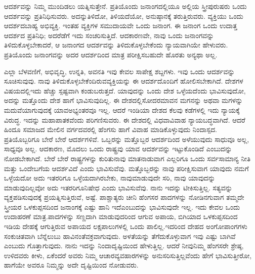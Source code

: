 ಆದರ್ಶವನ್ನು ನಿಮ್ಮ ಮುಂದಿಡಲು ಯತ್ನಿಸುತ್ತೇನೆ. ಪ್ರತಿಯೊಂದು ಜನಾಂಗ\break ದಲ್ಲಿಯೂ ಅಲ್ಲಿಯ ಸ್ತ್ರೀಪುರುಷರು ಒಂದು ಆದರ್ಶವನ್ನು ಪ್ರತಿನಿಧಿಸುವರು. ಅದನ್ನು\break ತಿಳಿದೋ, ತಿಳಿಯದೆಯೋ, ಅನುಷ್ಠಾನಕ್ಕೆ ತರುತ್ತಿರುವರು. ವ್ಯಕ್ತಿಯು ಒಂದು ಆದರ್ಶದ\break ಬಾಹ್ಯ ಅಭಿವ್ಯಕ್ತಿ. ಇಂತಹ ವ್ಯಕ್ತಿಗಳ ಸಮುದಾಯವೇ ಒಂದು ಜನಾಂಗ. ಈ ಜನಾಂಗ ಒಂದು ಉದಾತ್ತ ಆದರ್ಶದ ಪ್ರತಿನಿಧಿ; ಅದರೆಡೆಗೆ ಇದು ಸಂಚರಿಸುತ್ತಿದೆ. ಆದಕಾರಣವೇ, ನಾವು ಒಂದು ಜನಾಂಗವನ್ನು ತಿಳಿದುಕೊಳ್ಳಬೇಕಾದರೆ, ಆ ಜನಾಂಗದ ಆದರ್ಶವನ್ನು ತಿಳಿದುಕೊಳ್ಳಬೇಕೆಂದು ನ್ಯಾಯವಾಗಿಯೇ ಹೇಳುವರು. ಪ್ರತಿಯೊಂದು ಜನಾಂಗವನ್ನು ಅದರ ಆದರ್ಶದಿಂದ ಮಾತ್ರ ಪರೀಕ್ಷಿಸಬಹುದೇ ಹೊರತು ಅನ್ಯಥಾ ಅಲ್ಲ.

ಎಲ್ಲಾ ಬೆಳವಣಿಗೆ, ಅಭಿವೃದ್ಧಿ, ಉನ್ನತಿ, ಅವನತಿ ಇವು ಕೇವಲ ಸಾಪೇಕ್ಷ ಶಬ್ದಗಳು. ಇವು ಒಂದು ಆದರ್ಶವನ್ನು ಸೂಚಿಸುವುವು. ನಾವು ತಿಳಿದುಕೊಳ್ಳಬೇಕೆಂದಿರುವ\break ವ್ಯಕ್ತಿಯನ್ನು ಈ ಆದರ್ಶದೊಂದಿಗೆ ಹೋಲಿಸಬೇಕಾಗಿದೆ. ದೇಶಗಳ ವಿಷಯದಲ್ಲಿ\break ಇದು ಹೆಚ್ಚು ಸ್ಪಷ್ಟವಾಗಿ ಕಂಡುಬರುತ್ತದೆ. ಯಾವುದನ್ನು ಒಂದು ದೇಶ ಒಳ್ಳೆಯದೆಂದು ಭಾವಿಸುವುದೋ, ಅದನ್ನು ಮತ್ತೊಂದು ದೇಶ ಹಾಗೆ ಭಾವಿಸುವುದಿಲ್ಲ. ಈ ದೇಶದಲ್ಲಿ\break ಸೋದರಮಾವನ ಮಗನನ್ನು ಅಥವಾ ಮಗಳನ್ನು ಮದುವೆಯಾಗುವುದಕ್ಕೆ ಯಾವ\break ಅಭ್ಯಂತರವೂ ಇಲ್ಲ. ಆದರೆ ಇಂಡಿಯಾ ದೇಶದ ಕೆಲವು ಕಡೆಗಳಲ್ಲಿ ಇದು ನ್ಯಾಯಕ್ಕೆ ವಿರುದ್ಧ. ಇದನ್ನು ಮಹಾಪಾತಕವೆಂದು ಪರಿಗಣಿಸುವರು. ಈ ದೇಶದಲ್ಲಿ ವಿಧವಾ\break ವಿವಾಹ ನ್ಯಾಯಬದ್ಧವಾಗಿದೆ. ಆದರೆ ಹಿಂದೂ ಸಮಾಜದ ಮೇಲಿನ ವರ್ಗದವರಲ್ಲಿ ಹೆಂಗಸು ಹಾಗೆ ವಿವಾಹ ಮಾಡಿಕೊಳ್ಳುವುದು ನಿಂದಾಸ್ಪದ. ಪ್ರತಿಯೊಬ್ಬರಿಗೂ ಬೇರೆ ಬೇರೆ ಆದರ್ಶಗಳಿವೆ. ಒಬ್ಬರನ್ನು ಮತ್ತೊಬ್ಬರ ಆದರ್ಶದಿಂದ ಅಳೆಯುವುದು ಸಾಧುವೂ ಅಲ್ಲ, ಸಾಧ್ಯವೂ ಅಲ್ಲ. ಆದಕಾರಣ, ಮೊದಲು ಒಂದು ರಾಷ್ಟ್ರವು ಯಾವ ಆದರ್ಶವನ್ನು ಇಟ್ಟುಕೊಂಡಿದೆ ಎಂಬುದನ್ನು ನೋಡಬೇಕಾಗಿದೆ. ಬೇರೆ ಬೇರೆ ರಾಷ್ಟ್ರಗಳನ್ನು ಕುರಿತು\break ನಾವು ಮಾತನಾಡುವಾಗ ಎಲ್ಲರಿಗೂ ಒಂದು ಸರ್ವಸಾಮಾನ್ಯ ನೀತಿ ಮತ್ತು ಒಂದೇ\break ಬಗೆಯ ಆದರ್ಶವಿದೆ ಎಂದು ಭಾವಿಸುವೆವು. ಮತ್ತೊಬ್ಬರನ್ನು ನಾವು ಪರೀಕ್ಷಿಸುವಾಗ ಯಾವುದು ನಮಗೆ ಒಳ್ಳೆಯದೋ ಅದು ಇತರರಿಗೂ ಒಳ್ಳೆಯದಾಗಿರಬೇಕು, ನಾವು\break ಮಾಡುವುದೇ ಸರಿ, ನಾವು ಯಾವುದನ್ನು ಮಾಡುವುದಿಲ್ಲವೋ ಅದು ಇತರರಿಗೂ\break ನಿಷೇಧ ಎಂದು ಭಾವಿಸುವೆವು. ನಾನು ಇದನ್ನು ಟೀಕಿಸುತ್ತಿಲ್ಲ. ಸತ್ಯವನ್ನು ವ್ಯಕ್ತಪಡಿಸು\-ವುದಕ್ಕೆ ಪ್ರಯತ್ನಿಸುತ್ತಿರುವೆ, ಅಷ್ಟೆ. ಪಾಶ್ಚಾತ್ಯರು ಚೀನಿ ಹೆಂಗಸರ ಪಾದಗಳನ್ನು ನೋಡಿ\break ನಗುವಾಗ ತಮ್ಮದೇ ಸ್ತ್ರೀಯರ ಒಳಕುಪ್ಪಸದಿಂದ ಜನಾಂಗಕ್ಕೆ ಎಷ್ಟು ಹಾನಿ ಇದೆ\break ಎಂಬುದನ್ನು ಭಾವಿಸುವುದೇ ಇಲ್ಲ. ಇದು ಕೇವಲ ಒಂದು ಉದಾಹರಣೆ ಮಾತ್ರ.\break ಪಾದಗಳನ್ನು ಸಣ್ಣದಾಗಿ ಮಾಡುವುದರಿಂದ ಆಗುವ ಅಪಾಯ, ಬಿಗಿಯಾದ ಒಳಕುಪ್ಪಸದಿಂದ ಇಡಿಯ ದೇಹಕ್ಕೆ ಆಗುತ್ತಿರುವ ಅಪಾಯದ ಲಕ್ಷಪಾಲುಗಳಲ್ಲಿ ಒಂದು ಪಾಲಿಲ್ಲ.\break ಇದರಿಂದ ದೇಹದ ಅಂಗೋಪಾಂಗಗಳು ಸಂಕುಚಿತವಾಗಿ ಬೆನ್ನೆಲುಬು ಹಾವಿನಂತೆ\break ವಕ್ರವಾಗುವುದು. ಅಳತೆಯನ್ನು ತೆಗೆದುಕೊಳ್ಳುವಾಗ ಇವು ಎಷ್ಟು ಬಾಗಿವೆ ಎಂಬುದು ಗೊತ್ತಾಗುವುದು. ನಾನು ಇದನ್ನು ನಿಂದಾದೃಷ್ಟಿಯಿಂದ ಹೇಳುತ್ತಿಲ್ಲ. ಆದರೆ ನೀವು\break ನಿಮ್ಮ ಹೆಂಗಸರೇ ಶ್ರೇಷ್ಠ, ಉಳಿದವರು ಕೀಳು, ಏಕೆಂದರೆ ಅವರು ನಿಮ್ಮ ಆಚಾರ\break ವ್ಯವಹಾರಗಳನ್ನು ಅನುಸರಿಸುತ್ತಿಲ್ಲವೆಂದು ಹೇಗೆ ಭಾವಿಸುತ್ತೀರೋ, ಹಾಗೆಯೇ ಅವರೂ ನಿಮ್ಮನ್ನು ಅದೇ ದೃಷ್ಟಿಯಿಂದ ನೋಡುವರು.

